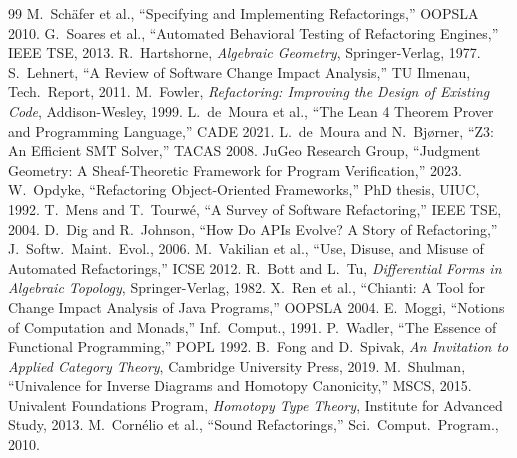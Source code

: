 \documentclass[11pt]{article}
\begin{document}
\begin{thebibliography}{99}
M.~Schäfer et al., ``Specifying and Implementing Refactorings,''
OOPSLA 2010.
G.~Soares et al., ``Automated Behavioral Testing of Refactoring
Engines,'' IEEE TSE, 2013.
R.~Hartshorne, \emph{Algebraic Geometry}, Springer-Verlag, 1977.
S.~Lehnert, ``A Review of Software Change Impact Analysis,'' TU
Ilmenau, Tech.\ Report, 2011.
M.~Fowler, \emph{Refactoring: Improving the Design of Existing Code},
Addison-Wesley, 1999.
L.~de~Moura et al., ``The Lean 4 Theorem Prover and Programming
Language,'' CADE 2021.
L.~de~Moura and N.~Bjørner, ``Z3: An Efficient SMT Solver,''
TACAS 2008.
JuGeo Research Group, ``Judgment Geometry: A Sheaf-Theoretic Framework
for Program Verification,'' 2023.
W.~Opdyke, ``Refactoring Object-Oriented Frameworks,'' PhD thesis,
UIUC, 1992.
T.~Mens and T.~Tourwé, ``A Survey of Software Refactoring,'' IEEE TSE,
2004.
D.~Dig and R.~Johnson, ``How Do APIs Evolve? A Story of
Refactoring,'' J.\ Softw.\ Maint.\ Evol., 2006.
M.~Vakilian et al., ``Use, Disuse, and Misuse of Automated
Refactorings,'' ICSE 2012.
R.~Bott and L.~Tu, \emph{Differential Forms in Algebraic Topology},
Springer-Verlag, 1982.
X.~Ren et al., ``Chianti: A Tool for Change Impact Analysis of Java
Programs,'' OOPSLA 2004.
E.~Moggi, ``Notions of Computation and Monads,'' Inf.\ Comput., 1991.
P.~Wadler, ``The Essence of Functional Programming,'' POPL 1992.
B.~Fong and D.~Spivak, \emph{An Invitation to Applied Category
Theory}, Cambridge University Press, 2019.
M.~Shulman, ``Univalence for Inverse Diagrams and Homotopy
Canonicity,'' MSCS, 2015.
{Univalent Foundations Program}, \emph{Homotopy Type Theory},
Institute for Advanced Study, 2013.
M.~Cornélio et al., ``Sound Refactorings,'' Sci.\ Comput.\
Program., 2010.
\end{thebibliography}
\end{document}
